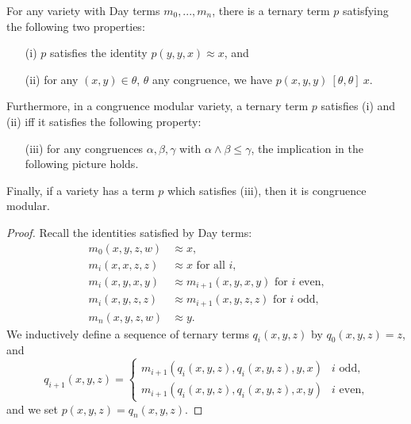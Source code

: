 \begin{appendices}
\begin{thm}\label{gumm-difference} For any variety with Day terms $m_0, ..., m_n$, there is a ternary term $p$ satisfying the following two properties:
\begin{itemize}
\item[(i)] $p$ satisfies the identity $p(y,y,x) \approx x$, and

\item[(ii)] for any $(x,y) \in \theta$, $\theta$ any congruence, we have $p(x,y,y)\ [\theta,\theta]\ x$.
\end{itemize}
Furthermore, in a congruence modular variety, a ternary term $p$ satisfies (i) and (ii) iff it satisfies the following property:
\begin{itemize}
\item[(iii)] for any congruences $\alpha,\beta,\gamma$ with $\alpha \wedge \beta \le \gamma$, the implication in the following picture holds.
\begin{center}
\end{center}
\end{itemize}
Finally, if a variety has a term $p$ which satisfies (iii), then it is congruence modular.
\end{thm}
\begin{proof} Recall the identities satisfied by Day terms:
\begin{align*}
m_0(x,y,z,w) &\approx x,\\
m_i(x,x,z,z) &\approx x\text{ for all $i$,}\\
m_i(x,y,x,y) &\approx m_{i+1}(x,y,x,y)\text{ for $i$ even,}\\
m_i(x,y,z,z) &\approx m_{i+1}(x,y,z,z)\text{ for $i$ odd,}\\
m_n(x,y,z,w) &\approx y.
\end{align*}
We inductively define a sequence of ternary terms $q_i(x,y,z)$ by $q_0(x,y,z) = z$, and
\[
q_{i+1}(x,y,z) = \begin{cases} m_{i+1}(q_{i}(x,y,z),q_{i}(x,y,z),y,x) & i\text{ odd,}\\ m_{i+1}(q_{i}(x,y,z),q_{i}(x,y,z),x,y) & i\text{ even,}\end{cases}
\]
and we set $p(x,y,z) = q_n(x,y,z)$.


\end{proof}
\end{appendices}
